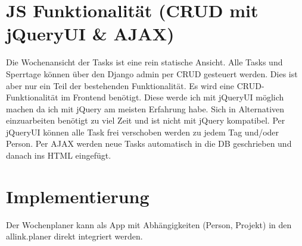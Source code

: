 \section{JS Funktionalität (CRUD mit jQueryUI \& AJAX) }
Die Wochenansicht der Tasks ist eine rein statische Ansicht.
Alle Tasks und Sperrtage können über den Django admin per CRUD gesteuert werden. Dies ist aber nur ein Teil der bestehenden Funktionalität.
Es wird eine CRUD-Funktionalität im Frontend benötigt. Diese werde ich mit jQueryUI möglich machen da ich mit jQuery am meisten Erfahrung habe.
Sich in Alternativen einzuarbeiten benötigt zu viel Zeit und ist nicht mit jQuery kompatibel.
Per jQueryUI können alle Task frei verschoben werden zu jedem Tag und/oder Person.
Per AJAX werden neue Tasks automatisch in die DB geschrieben und danach ins HTML eingefügt.
\section{Implementierung}
Der Wochenplaner kann als App mit Abhängigkeiten (Person, Projekt) in den allink.planer direkt integriert werden.
